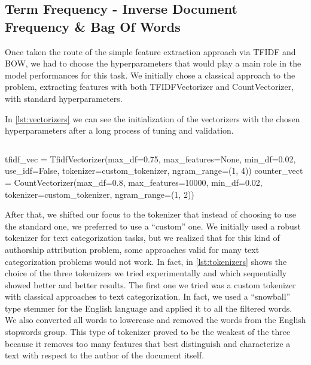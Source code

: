 \subsection{Term Frequency - Inverse Document Frequency \& Bag Of Words}
Once taken the route of the simple feature extraction approach via TFIDF and BOW, we had to choose the hyperparameters that would play a main role in the model performances for this task. 
We initially chose a classical approach to the problem, extracting features with both TFIDFVectorizer and CountVectorizer, with standard hyperparameters.


In \autoref{lst:vectorizers} we can see the initialization of the vectorizers with the chosen hyperparameters after a long process of tuning and validation.

\begin{lstlisting}[frame=none,caption={TFIDF \& BOW Vectorizer.},captionpos=b,label=lst:vectorizers]
\end{lstlisting}
\begin{python}	
	tfidf_vec = TfidfVectorizer(max_df=0.75, max_features=None,
	min_df=0.02, use_idf=False, tokenizer=custom_tokenizer, 
	ngram_range=(1, 4))
	counter_vect = CountVectorizer(max_df=0.8, max_features=10000,
	min_df=0.02, tokenizer=custom_tokenizer, ngram_range=(1, 2))
\end{python}

After that, we shifted our focus to the tokenizer that instead of choosing to use the standard one, we preferred to use a \enquote{custom} one. We initially used a robust tokenizer for text categorization tasks, but we realized that for this kind of authorship attribution problem, some approaches valid for many text categorization problems would not work.
In fact, in \autoref{lst:tokenizers} shows the choice of the three tokenizers we tried experimentally and which sequentially showed better and better results. The first one we tried was a custom tokenizer with classical approaches to text categorization. In fact, we used a \enquote{snowball} type stemmer for the English language and applied it to all the filtered words. We also converted all words to lowercase and removed the words from the English stopwords group. This type of tokenizer proved to be the weakest of the three because it removes too many features that best distinguish and characterize a text with respect to the author of the document itself.

